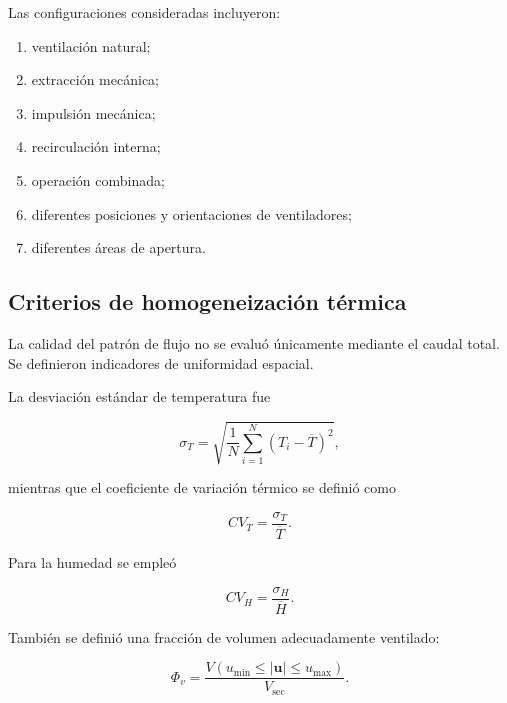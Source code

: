 Las configuraciones consideradas incluyeron:

\begin{enumerate}
    \item ventilación natural;
    \item extracción mecánica;
    \item impulsión mecánica;
    \item recirculación interna;
    \item operación combinada;
    \item diferentes posiciones y orientaciones de ventiladores;
    \item diferentes áreas de apertura.
\end{enumerate}

\subsection{Criterios de homogeneización térmica}
\label{subsec:criterios_homogeneizacion}

La calidad del patrón de flujo no se evaluó únicamente mediante el caudal total. Se definieron indicadores de uniformidad espacial.

La desviación estándar de temperatura fue

\begin{equation}
\sigma_T
=
\sqrt{
\frac{1}{N}
\sum_{i=1}^{N}
\left(
T_i-\overline{T}
\right)^2
},
\label{eq:desviacion_temperatura_actuador}
\end{equation}

mientras que el coeficiente de variación térmico se definió como

\begin{equation}
CV_T
=
\frac{\sigma_T}{\overline{T}}.
\label{eq:cv_temperatura_actuador}
\end{equation}

Para la humedad se empleó

\begin{equation}
CV_H
=
\frac{\sigma_H}{\overline{H}}.
\label{eq:cv_humedad_actuador}
\end{equation}

También se definió una fracción de volumen adecuadamente ventilado:

\begin{equation}
\Phi_v
=
\frac{
V
\left(
u_{\min}
\leq
|\mathbf{u}|
\leq
u_{\max}
\right)
}{
V_{\mathrm{sec}}
}.
\label{eq:fraccion_volumen_ventilado}
\end{equation}


